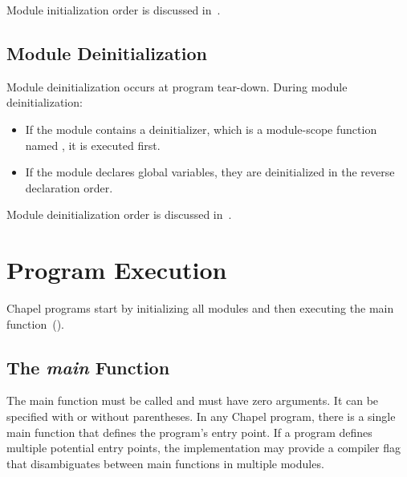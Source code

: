 Module initialization order is discussed
in~.


\subsection{Module Deinitialization}
\label{Module_Deinitialization}

Module deinitialization occurs at program tear-down.
During module deinitialization:

\begin{itemize}

\item If the module contains a deinitializer, which is a module-scope function
named , it is executed first.

\item If the module declares global variables, they are deinitialized
in the reverse declaration order.

\end{itemize}


Module deinitialization order is discussed
in~.


\section{Program Execution}
\label{Program_Execution}

Chapel programs start by initializing all modules and then executing
the main function~().

\subsection{The {\em main} Function}
\label{The_main_Function}

The main function must be called  and must have zero
arguments.  It can be specified with or without parentheses.  In any
Chapel program, there is a single main function that defines the
program's entry point.  If a program defines multiple potential entry
points, the implementation may provide a compiler flag that
disambiguates between main functions in multiple modules.

